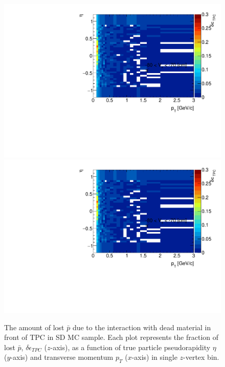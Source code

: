\begin{figure}[H]
	\caption[The amount of lost $\bar{p}$ due to the interaction with dead material in front of TPC as a function of $p_T$, $\eta$ and $z$-vertex in SD]{The amount of lost $\bar{p}$ due to the interaction with dead material in front of TPC in SD MC sample. Each plot represents the fraction of lost $\bar{p}$, $\delta\epsilon_{ TPC}$ ($z$-axis), as a function of true particle pseudorapidity $\eta$ ($y$-axis) and transverse momentum $p_{T}$ ($x$-axis) in single $z$-vertex bin.}\label{fig:dead_materialSD3Dpbar}
	\parbox{0.325\textwidth}{
		\includegraphics[width=\linewidth,page=33]{graphics/systematicsEfficiency/deadMaterial/secondaries_Unbinned_SD_.pdf}\\
		\includegraphics[width=\linewidth,page=36]{graphics/systematicsEfficiency/deadMaterial/secondaries_Unbinned_SD_.pdf}\\
}
\end{figure}
